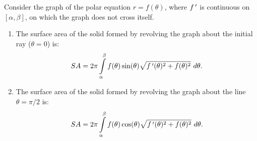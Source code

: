 \begin{theorem}\label{thm:surface_area_polar}
Consider the graph of the polar equation $r=f(\theta)$, where $f\,'$ is continuous on  $[\alpha,\beta]$, on which the graph does not cross itself.
	\begin{enumerate}
		\item The surface area of the solid formed by revolving the graph about the initial ray ($\theta=0$) is:
		$$SA = 2\pi\int\limits_\alpha^\beta f(\theta)\sin(\theta)\sqrt{\fp(\theta)^2+f(\theta)^2}\ d\theta.$$
		\item The surface area of the solid formed by revolving the graph about the line $\theta=\pi/2$ is:
		$$SA = 2\pi\int\limits_\alpha^\beta f(\theta)\cos(\theta)\sqrt{\fp(\theta)^2+f(\theta)^2}\ d\theta.$$
	\end{enumerate}
\end{theorem}

